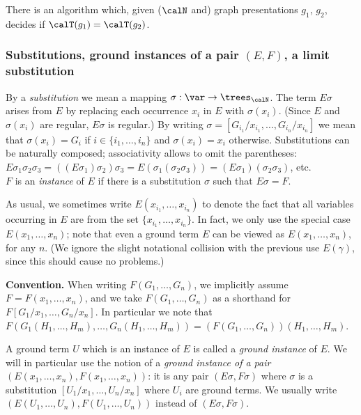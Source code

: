 \documentclass[12pt]{article}
\begin{document}
\begin{observ}\label{prop:algorgraphequality}
There is an algorithm which, given ($\calN$ and) 
graph presentations $g_1$, $g_2$, decides if $\calT(g_1)=\calT(g_2)$.
\end{observ}


\subsubsection*{Substitutions, 
ground instances of a pair
$(E,F)$, a limit substitution}

By a \emph{substitution}
we mean a mapping $\sigma:\var\rightarrow \trees_{\calN}$.
The term $E\sigma$ arises from $E$ by 
replacing each occurrence $x_i$ in $E$ with $\sigma(x_i)$.
(Since $E$ and $\sigma(x_i)$ are regular, $E\sigma$ is regular.)
By writing $\sigma=[G_{i_1}/x_{i_1},\dots, G_{i_n}/x_{i_n}]$
we mean that $\sigma(x_i)=G_i$ if $i\in\{i_1,\dots,i_n\}$ and 
$\sigma(x_i)=x_i$ otherwise. Substitutions can be naturally composed;
associativity allows to omit the parentheses:
$E\sigma_1\sigma_2\sigma_3=((E\sigma_1)\sigma_2)\sigma_3=
E(\sigma_1(\sigma_2\sigma_3))=(E\sigma_1)(\sigma_2\sigma_3)$, etc.
\\
$F$ is an \emph{instance} of $E$ if there is 
a substitution $\sigma$ such that $E\sigma=F$. 

As usual, we sometimes write $E(x_{i_1},\dots,x_{i_n})$
to denote the fact
that all variables occurring in $E$  
are from the set
$\{x_{i_1},\dots,x_{i_n}\}$.
In fact, we only use the special case $E(x_{1},\dots,x_{n})$;
note that even a ground term $E$ 
can be viewed
as $E(x_1,\dots,x_n)$, for any $n$.
(We ignore the slight notational collision with 
the previous use $E(\gamma)$, since this should cause no problems.)

\smallskip
\noindent
\textbf{Convention.} When writing $F(G_1,\dots,G_n)$, we implicitly
assume $F=F(x_1,\dots,x_n)$, and we take 
 $F(G_1,\dots,G_n)$ as a
shorthand for $F[G_1/x_1,\dots, G_n/x_n]$. In particular
we note that $F(G_1(H_1,\dots,H_m),\dots,G_n(H_1,\dots,H_m))=
(F(G_1,\dots,G_n))(H_1,\dots,H_m)$.

\smallskip

\noindent
A ground term $U$ which is an instance of $E$ is called
a \emph{ground instance} of $E$.
We will in particular use the notion
of a \emph{ground instance of a pair} 
$(E(x_1,\dots,x_n),F(x_1,\dots,x_n))$: it is any 
pair $(E\sigma,F\sigma)$
where $\sigma$ is a substitution $[U_1/x_1,\dots, U_n/x_n]$ 
where $U_i$ are ground terms.
We usually write $(E(U_1,\dots,U_n),F(U_1,\dots,U_n))$ instead of 
 $(E\sigma,F\sigma)$.
\end{document}
